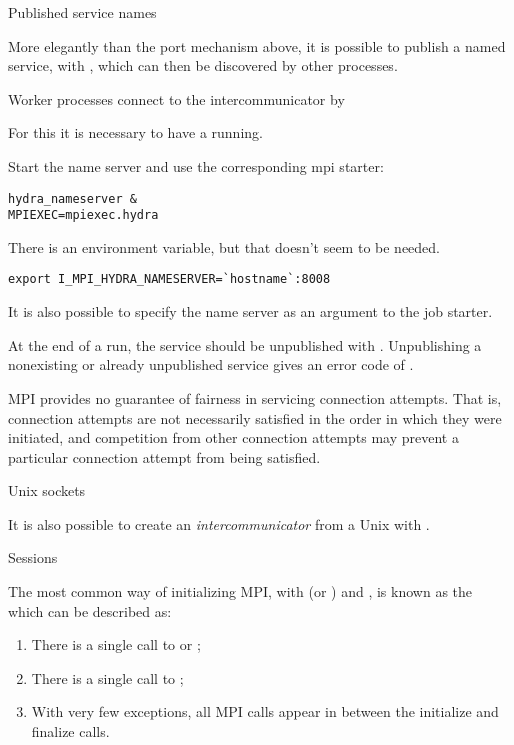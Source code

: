  {Published service names}
\label{sec:mpi-publish}

More elegantly than the port mechanism above,
it is possible to publish a named service, 
with ,
which can then be discovered by other processes.


Worker processes connect to the intercommunicator by


For this it is necessary to have a  running.

\begin{intelnote}
Start the  name server and use the corresponding mpi starter:
\begin{verbatim}
hydra_nameserver &
MPIEXEC=mpiexec.hydra
\end{verbatim}
There is an environment variable, but that doesn't seem to be needed.
\begin{verbatim}
export I_MPI_HYDRA_NAMESERVER=`hostname`:8008
\end{verbatim}
It is also possible to specify the name server as an argument to the job starter.
\end{intelnote}

At the end of a run, the service should be unpublished with
.
Unpublishing a nonexisting or already unpublished service gives an
error code of .

MPI provides no guarantee of fairness in servicing connection
attempts. That is, connection attempts are not necessarily satisfied
in the order in which they were initiated, and competition from other
connection attempts may prevent a particular connection attempt from
being satisfied.

 {Unix sockets}

It is also possible to create an
\emph{intercommunicator} from a Unix
with
.

 {Sessions}
\label{sec:session}

The most common way of initializing MPI,
with  (or ) and ,
is known as the  which can be described as:
\begin{enumerate}
\item There is a single call to  or ;
\item There is a single call to ;
\item With very few exceptions, all MPI calls appear in between the initialize and finalize calls.
\end{enumerate}

